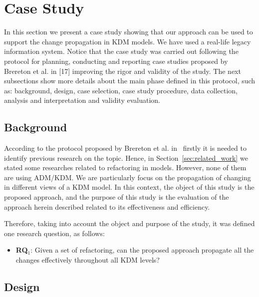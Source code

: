 
\section{Case Study}\label{sec:case_study}

In this section we present a case study showing that our approach can be used to support the change propagation in KDM models. We have used a real-life legacy information system. 
Notice that the case study was carried out following the protocol for planning, conducting and reporting case studies proposed by Brereton et al. in [17] improving the rigor and validity of the study. The next subsections show more details about the main phase defined in this protocol, such as: background, design, case selection, case study procedure, data collection, analysis and interpretation and validity evaluation.

\subsection{Background}

According to the protocol proposed by Brereton et al. in~\cite{Brereton:2008} firstly it is needed to identify previous research on the topic. Hence, in Section~\ref{sec:related_work} we stated some researches related to refactoring in models. However, none of them are using ADM/KDM. We are particularly focus on the propagation of changing in different views of a KDM model. In this context, the object of this study is the proposed approach, and the purpose of this study is the evaluation of the approach herein described related to its effectiveness and efficiency.

Therefore, taking into account the object and purpose of the study, it was defined one research question, as follows:

\begin{itemize}
\item \textbf{RQ$_1$}: Given a set of refactoring, can the proposed approach propagate all the changes effectively throughout all KDM levels?
\end{itemize}


\subsection{Design}

